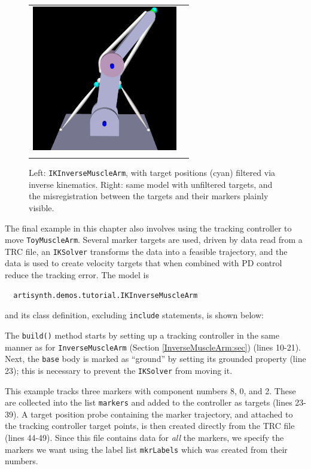 \begin{figure}[ht]
\begin{center}
\begin{tabular}{cc}
   \includegraphics[width=2.5in]{images/IKInverseMuscleArm1}\\
\fi
\end{tabular}
\end{center}
\caption{Left: {\tt IKInverseMuscleArm}, with target positions (cyan)
filtered via inverse kinematics. Right: same model with unfiltered targets, and
the misregistration between the targets and their markers plainly visible.}
\label{IKInverseMuscleArm:fig}
\end{figure}

The final example in this chapter also involves using the tracking controller
to move {\tt ToyMuscleArm}. Several marker targets are used, driven by data
read from a TRC file, an {\tt IKSolver} transforms the data into a feasible
trajectory, and the data is used to create velocity targets that when combined
with PD control reduce the tracking error. The model is
%
\begin{verbatim}
  artisynth.demos.tutorial.IKInverseMuscleArm
\end{verbatim}
%
and its class definition, excluding {\tt include} statements, is shown below:
%
\lstset{numbers=left}
\iflatexml

\else

\fi
\lstset{numbers=none}
%
The {\tt build()} method starts by setting up a tracking controller in the same
manner as for {\tt InverseMuscleArm} (Section \ref{InverseMuscleArm:sec})
(lines 10-21). Next, the {\tt base} body is marked as ``ground'' by setting its
{\sf grounded} property (line 23); this is necessary to prevent the {\tt IKSolver}
from moving it.

This example tracks three markers with component numbers 8, 0, and 2.  These
are collected into the list {\tt markers} and added to the controller as
targets (lines 23-39). A target position probe containing the marker
trajectory, and attached to the tracking controller target points, is then
created directly from the TRC file (lines 44-49). Since this file contains data
for {\it all} the markers, we specify the markers we want using the label
list {\tt mkrLabels} which was created from their numbers.

